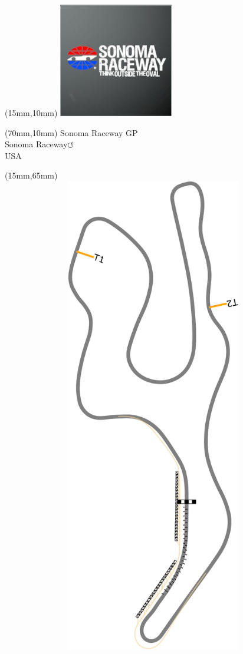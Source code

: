 \null\newpage
\begin{textblock*}{50mm}(15mm,10mm)%
\includegraphics[width=50mm]{LG/2015-05-20_00096.png}
\end{textblock*}
\begin{textblock*}{130mm}(70mm,10mm)%
{\fontsize{20}{20}\selectfont Sonoma Raceway GP\\}
{\fontsize{16}{16}\selectfont Sonoma Raceway\hfill \huge$\circlearrowleft$\\}
{\fontsize{12}{12}\selectfont USA\\}
\end{textblock*}
\begin{textblock*}{185mm}(15mm,65mm)%
\centering
\mbox{\includegraphics[width=185mm,height=210mm,keepaspectratio]{PT/SORAGP.pdf}}
\end{textblock*}
